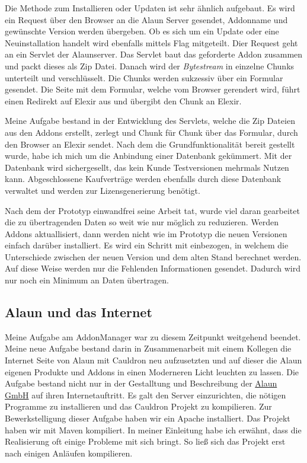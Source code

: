 \documentclass[12pt]{article}
\begin{document}
Die Methode zum Installieren oder Updaten ist sehr ähnlich aufgebaut. Es wird ein Request über den Browser an die Alaun Server gesendet, Addonname
und gewünschte Version werden übergeben. Ob es sich um ein Update oder eine Neuinstallation handelt wird ebenfalls mittels Flag mitgeteilt.
Dier Request geht an ein Servlet der Alaunserver. Das Servlet baut das geforderte Addon zusammen und packt dieses als Zip Datei. Danach wird
der \textit{Bytestream} in einzelne Chunks unterteilt und verschlüsselt. Die Chunks werden sukzessiv über ein Formular gesendet. Die Seite mit dem 
Formular, welche vom Browser gerendert wird, führt einen Redirekt auf Elexir aus und übergibt den Chunk an Elexir.

Meine Aufgabe bestand in der Entwicklung des Servlets, welche die Zip Dateien aus den Addons erstellt, zerlegt und Chunk für Chunk über das Formular,
durch den Browser an Elexir sendet.
Nach dem die Grundfunktionalität bereit gestellt wurde, habe ich mich um die Anbindung einer Datenbank gekümmert. Mit der Datenbank wird sichergesellt,
das kein Kunde Testversionen mehrmals Nutzen kann. Abgeschlossene Kaufverträge werden ebenfalls durch diese Datenbank verwaltet und werden zur
Lizensgenerierung benötigt.

Nach dem der Prototyp einwandfrei seine Arbeit tat, wurde viel daran gearbeitet die zu übertragenden Daten so weit wie nur möglich zu reduzieren.
Werden Addons aktuallisiert, dann werden nicht wie im Prototyp die neuen Versionen einfach darüber installiert. Es wird ein Schritt mit einbezogen,
in welchem die Unterschiede zwischen der neuen Version und dem alten Stand berechnet werden. Auf diese Weise werden nur die Fehlenden Informationen
gesendet. Dadurch wird nur noch ein Minimum an Daten übertragen.

\subsection{Alaun und das Internet}

Meine Aufgabe am AddonManager war zu diesem Zeitpunkt weitgehend beendet. Meine neue Aufgabe bestand darin in Zusammenarbeit mit einem Kollegen
die Internet Seite von Alaun mit Cauldron neu aufzusetzten und auf dieser die Alaun eigenen Produkte und Addons in einen Moderneren Licht leuchten
zu lassen. Die Aufgabe bestand nicht nur in der Gestalltung und Beschreibung der \href{https://alaun.de/home/}{Alaun GmbH} auf ihren Internetauftritt.
Es galt den Server einzurichten, die nötigen Programme zu installieren und das Cauldron Projekt zu kompilieren.
Zur Bewerkstelligung dieser Aufgabe haben wir ein Apache installiert. Das Projekt haben wir mit Maven kompiliert.
In meiner Einleitung habe ich erwähnt, dass die Realisierung oft einige Probleme mit sich bringt.
So ließ sich das Projekt erst nach einigen Anläufen kompilieren. 
\end{document}
